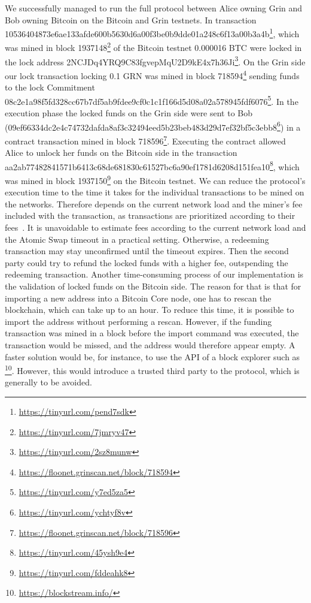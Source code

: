 We successfully managed to run the full protocol between Alice owning Grin and Bob owning Bitcoin on the Bitcoin and Grin testnets.
In transaction \\10536404873e6ae133afde600b5630d6a00f3be0b9dde01a248c6f13a00b3a4b\footnote{\url{https://tinyurl.com/pend7sdk}}, which was mined in block 1937148\footnote{\url{https://tinyurl.com/7jmryv47}} of the Bitcoin testnet 0.000016 BTC were locked in the lock address 2NCJDq4YRQ9C83fgvepMqU2D9kE4x7h36Ji\footnote{\url{https://tinyurl.com/2sz8munw}}.
On the Grin side our lock transaction locking 0.1 GRN was mined in block 718594\footnote{\url{https://floonet.grinscan.net/block/718594}} sending funds to the lock Commitment \\08c2e1a98f5fd328cc67b7df5ab9fdee9cf0c1c1f166d5d08a02a578945fdf6076\footnote{\url{https://tinyurl.com/y7ed5za5}}.
In the execution phase the locked funds on the Grin side were sent to Bob \\(09ef66334dc2e4c74732dafda8af3c32494eed5b23beb483d29d7ef32bf5c3ebb8\footnote{\url{https://tinyurl.com/ychtyf8v}}) in a contract transaction mined in block 718596\footnote{\url{https://floonet.grinscan.net/block/718596}}.
Executing the contract allowed Alice to unlock her funds on the Bitcoin side in the transaction \\ aa2ab77482841571b6413c68de681830c61527bc6a90ef1781d6208d151fea10\footnote{\url{https://tinyurl.com/45ysh9e4}}, which was mined in block 1937150\footnote{\url{https://tinyurl.com/fddeahk8}} on the Bitcoin testnet.
We can reduce the protocol's execution time to the time it takes for the individual transactions to be mined on the networks.
Therefore depends on the current network load and the miner's fee included with the transaction, as transactions are prioritized according to their fees~\cite{kasahara2016effect}.
It is unavoidable to estimate fees according to the current network load and the Atomic Swap timeout in a practical setting.
Otherwise, a redeeming transaction may stay unconfirmed until the timeout expires.
Then the second party could try to refund the locked funds with a higher fee, outspending the redeeming transaction.
Another time-consuming process of our implementation is the validation of locked funds on the Bitcoin side.
The reason for that is that for importing a new address into a Bitcoin Core node, one has to rescan the blockchain, which can take up to an hour.
To reduce this time, it is possible to import the address without performing a rescan.
However, if the funding transaction was mined in a block before the import command was executed, the transaction would be missed, and the address would therefore appear empty.
A faster solution would be, for instance, to use the API of a block explorer such as \footnote{\url{https://blockstream.info/}}.
However, this would introduce a trusted third party to the protocol, which is generally to be avoided.



